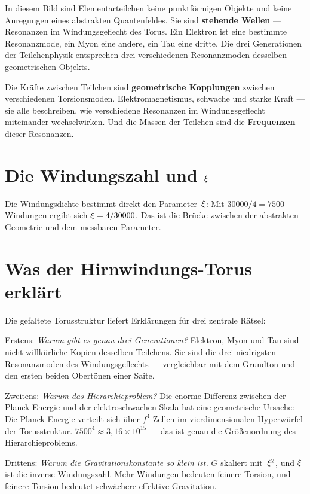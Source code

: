 In diesem Bild sind Elementarteilchen keine punktförmigen Objekte und keine Anregungen eines abstrakten Quantenfeldes. Sie sind \textbf{stehende Wellen} --- Resonanzen im Windungsgeflecht des Torus. Ein Elektron ist eine bestimmte Resonanzmode, ein Myon eine andere, ein Tau eine dritte. Die drei Generationen der Teilchenphysik entsprechen drei verschiedenen Resonanzmoden desselben geometrischen Objekts.

Die Kräfte zwischen Teilchen sind \textbf{geometrische Kopplungen} zwischen verschiedenen Torsionsmoden. Elektromagnetismus, schwache und starke Kraft --- sie alle beschreiben, wie verschiedene Resonanzen im Windungsgeflecht miteinander wechselwirken. Und die Massen der Teilchen sind die \textbf{Frequenzen} dieser Resonanzen.

\section{Die Windungszahl und $\xi$}

Die Windungsdichte bestimmt direkt den Parameter~$\xi$: Mit $30000/4 = 7500$ Windungen ergibt sich $\xi = 4/30000$. Das ist die Brücke zwischen der abstrakten Geometrie und dem messbaren Parameter.

\section{Was der Hirnwindungs-Torus erklärt}

Die gefaltete Torusstruktur liefert Erklärungen für drei zentrale Rätsel:

Erstens: \emph{Warum gibt es genau drei Generationen?} Elektron, Myon und Tau sind nicht willkürliche Kopien desselben Teilchens. Sie sind die drei niedrigsten Resonanzmoden des Windungsgeflechts --- vergleichbar mit dem Grundton und den ersten beiden Obertönen einer Saite.

Zweitens: \emph{Warum das Hierarchieproblem?} Die enorme Differenz zwischen der Planck-Energie und der elektroschwachen Skala hat eine geometrische Ursache: Die Planck-Energie verteilt sich über $f^4$ Zellen im vierdimensionalen Hyperwürfel der Torusstruktur. $7500^4 \approx 3{,}16 \times 10^{15}$ --- das ist genau die Größenordnung des Hierarchieproblems.

Drittens: \emph{Warum die Gravitationskonstante so klein ist.} $G$ skaliert mit~$\xi^2$, und $\xi$ ist die inverse Windungszahl. Mehr Windungen bedeuten feinere Torsion, und feinere Torsion bedeutet schwächere effektive Gravitation.

